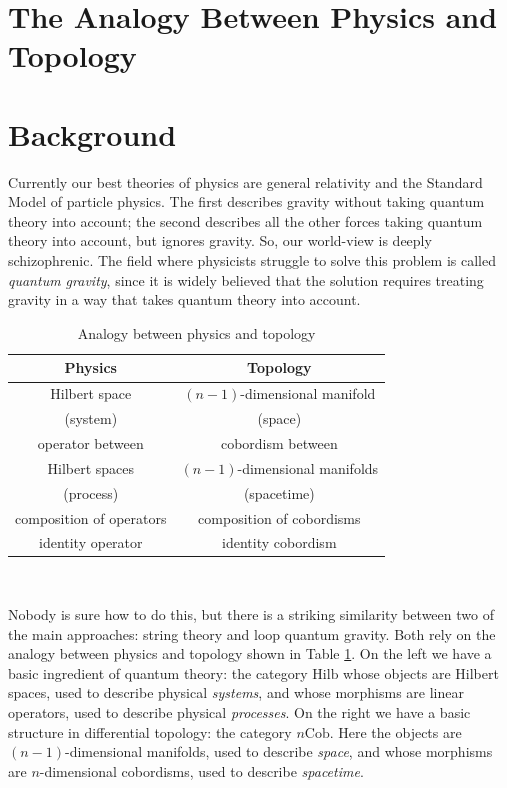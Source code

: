 \documentclass[12pt,twoside,openright]{report}
\newcommand{\Cob}{\mathrm{Cob}}
\newcommand{\Hilb}{\mathrm{Hilb}}
\begin{document}
\section{The Analogy Between Physics and Topology}
\label{physics_topology}

\section{Background}
\label{ptbackground}

Currently our best theories of physics are general relativity and the Standard Model of particle physics.  The first describes gravity without taking quantum theory into account; the second describes all the other forces taking quantum theory into account, but ignores gravity.  So, our world-view is deeply schizophrenic. The field where physicists struggle to solve this problem is called {\em quantum gravity}, since it is widely believed that the solution requires treating gravity in a way that takes quantum theory into account.

\begin{table}[h]
\begin{center}
\begin{tabular}{|c|c|}                    \hline Physics                           &  Topology \\  \hline Hilbert space                     &  $(n-1)$-dimensional manifold       \\  
(system)                          & (space)             \\  \hline operator between                  &  cobordism between  \\
Hilbert spaces                    & $(n-1)$-dimensional manifolds \\
(process)                         &  (spacetime)           \\  \hline composition of operators          &  composition of cobordisms \\  \hline identity operator                 &  identity cobordism \\  \hline
\end{tabular} 
\\
\caption{Analogy between physics and topology}
\label{analogy2}
\end{center}
\end{table}

Nobody is sure how to do this, but there is a striking similarity between two of the main approaches: string theory and loop quantum gravity.  Both rely on the analogy between physics and topology shown in Table \ref{analogy2}. On the left we have a basic ingredient of quantum theory: 
the category $\Hilb$ whose objects are Hilbert spaces, used to describe physical {\em systems}, and whose morphisms are linear operators, used to describe physical {\em processes}.  On the right we have a basic structure in differential topology: the category $n\Cob$. Here the objects are $(n-1)$-dimensional manifolds, used to describe
{\em space}, and whose morphisms are $n$-dimensional cobordisms, used to describe {\em spacetime}.  
\end{document}
